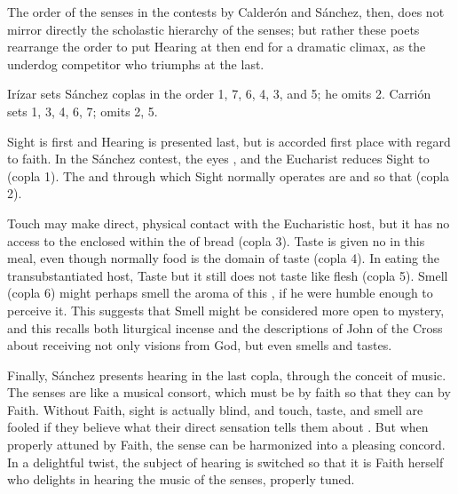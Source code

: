 The order of the senses in the contests by Calderón and Sánchez, then, does not mirror directly the scholastic hierarchy of the senses; but rather these poets rearrange the order to put Hearing at then end for a dramatic climax, as the underdog competitor who triumphs at the last.%
  \begin{Footnote}
  Irízar sets Sánchez coplas in the order 1, 7, 6, 4, 3, and 5; he omits 2.
  Carrión sets 1, 3, 4, 6, 7; omits 2, 5.
  \end{Footnote}
Sight is first and Hearing is presented last, but is accorded first place with regard to faith.
In the Sánchez contest, the eyes , and the Eucharist reduces Sight to  (copla 1).
The  and  through which Sight normally operates are   and  so that  (copla 2).

Touch may make direct, physical contact with the Eucharistic host, but it has no access to the  enclosed within the  of bread (copla 3).
Taste is given no  in this meal, even though normally food is the domain of taste (copla 4).
In eating the transubstantiated host, Taste  but it still does not taste like flesh (copla 5).
Smell (copla 6) might perhaps smell the aroma of this , if he were humble enough to perceive it.
This suggests that Smell might be considered more open to mystery, and this recalls both liturgical incense and the descriptions of John of the Cross about receiving not only visions from God, but even smells and tastes.

Finally, Sánchez presents hearing in the last copla, through the conceit of music.
The senses are  like a musical consort, which must be  by faith so that they can  by Faith.
Without Faith, sight is actually blind, and touch, taste, and smell are fooled if they believe what their direct sensation tells them about .
But when properly attuned by Faith, the sense can be harmonized into a pleasing concord.
In a delightful twist, the subject of hearing is switched so that it is Faith herself who delights in hearing the music of the senses, properly tuned. 

